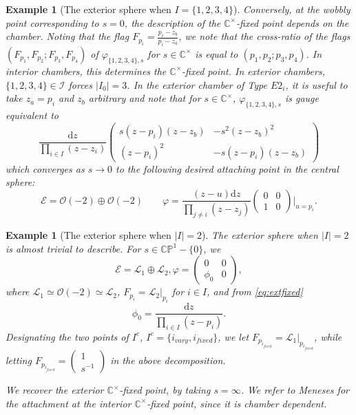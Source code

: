 \documentclass[12pt,letterpaper,reqno]{amsart}
\newtheorem{ex}[thm]{Example}
\theoremstyle{remark}
\theoremstyle{definition}
\numberwithin{thm}{section}
\numberwithin{equation}{section}
\numberwithin{figure}{section}
\newcommand{\cL}{\ensuremath{\mathcal L}}
\newcommand{\cO}{\ensuremath{\mathcal O}}
\newcommand{\C}{\ensuremath{\mathbb C}}
\newcommand{\CP}{\ensuremath{\mathbb {CP}}}
\newcommand{\cE}{{\mathcal E}}
\newcommand{\de}{\mathrm{d}}
\begin{document}
\begin{ex}[The exterior sphere when $I=\{1, 2, 3, 4\}$]
Conversely, at the wobbly point corresponding to $s=0$, the description of the $\C^\times$-fixed point depends on the chamber. Noting that the flag $F_{p_i} =\frac{p_i - z_b}{p_i-z_a}$, we note that the cross-ratio of the flags $(F_{p_1}, F_{p_2}; F_{p_3}, F_{p_4})$ of $\varphi_{\{1, 2, 3, 4\}, s}$ for $s \in \C^\times$ is equal to $(p_1, p_2; p_3, p_4)$. In interior chambers, this determines the $\C^\times$-fixed point. In exterior chambers, $\{1, 2, 3, 4\} \in \mathcal{I}$ forces $|I_0|=3$. In the exterior chamber of Type $E2_i$, it is useful to take $z_a=p_i$ and $z_b$ arbitrary and note that for $s \in \C^\times$, $\varphi_{\{1, 2, 3, 4\}, s}$ is gauge equivalent to\[  \frac{\de z}{\prod_{i \in I} (z-z_i)}  \begin{pmatrix} s(z-p_i)(z-z_b) & -s^2(z-z_b)^2 \\ (z-p_i)^2 & -s(z-p_i)(z-z_b)  \end{pmatrix}\]
which converges as $s \to 0$ to the following desired attaching point in the central sphere:
\[\cE=\cO(-2) \oplus \cO(-2) \qquad \varphi = \frac{(z-u) \de z}{\prod_{j \neq i} (z-z_j)} \begin{pmatrix} 0 & 0 \\ 1 & 0 \end{pmatrix} \Big|_{u=p_i}.\]

\end{ex}

\begin{ex}[The exterior sphere when $|I|=2$]
The exterior sphere when $|I|=2$ is almost trivial to describe.
For $s \in \CP^1-\{0\}$, we  
\begin{equation}
\mathcal{E} = \cL_1 \oplus \cL_2, \varphi =\begin{pmatrix}
        0&0\\\phi_0&0
\end{pmatrix},
\end{equation}
where $\cL_1 \simeq \cO(-2) \simeq \cL_2$, $F_{p_i} = \cL_2|_{p_i}$ for $i \in I$, and from \eqref{eq:extfixed}
\begin{equation} \phi_0 = \frac{\de z %
}{\prod_{i \in I} (z-p_i)}. \end{equation}
Designating the two points of $I^c$, $I^c=\{i_{vary}, i_{fixed}\}$, we let $F_{p_{i_{fixed}}} = \cL_1|_{p_{i_{fixed}}}$, while letting 
$F_{p_{i_{fixed}}} = \begin{pmatrix} 1\\ s^{-1} \end{pmatrix}$ in the above decomposition. 

We recover the exterior $\C^\times$-fixed point, by taking $s=\infty$. We refer to Meneses for the attachment at the interior $\C^\times$-fixed point, since it is chamber dependent. 
\end{ex}
\end{document}
